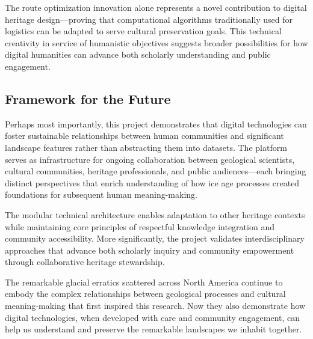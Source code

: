 The route optimization innovation alone represents a novel contribution to digital heritage design—proving that computational algorithms traditionally used for logistics can be adapted to serve cultural preservation goals. This technical creativity in service of humanistic objectives suggests broader possibilities for how digital humanities can advance both scholarly understanding and public engagement.

\subsection{Framework for the Future}
\label{subsec:framework_future}

Perhaps most importantly, this project demonstrates that digital technologies can foster sustainable relationships between human communities and significant landscape features rather than abstracting them into datasets. The platform serves as infrastructure for ongoing collaboration between geological scientists, cultural communities, heritage professionals, and public audiences—each bringing distinct perspectives that enrich understanding of how ice age processes created foundations for subsequent human meaning-making.

The modular technical architecture enables adaptation to other heritage contexts while maintaining core principles of respectful knowledge integration and community accessibility. More significantly, the project validates interdisciplinary approaches that advance both scholarly inquiry and community empowerment through collaborative heritage stewardship.

The remarkable glacial erratics scattered across North America continue to embody the complex relationships between geological processes and cultural meaning-making that first inspired this research. Now they also demonstrate how digital technologies, when developed with care and community engagement, can help us understand and preserve the remarkable landscapes we inhabit together.
